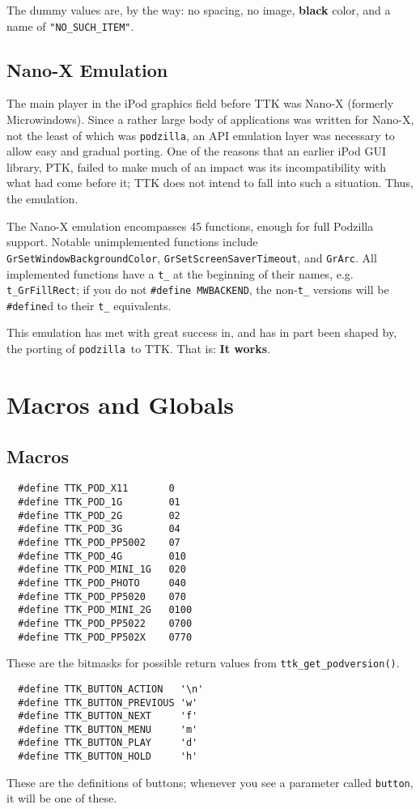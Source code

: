 \documentclass[12pt,letterpaper]{report}
\def\pz{\texttt{podzilla}}
\let\ttt\tt
\def\tt{\def\_{{\ttt\char`\_}}\ttt}
\def\texttt#1{{\tt #1}}
\begin{document}
The dummy values are, by the way: no spacing, no image, {\bf black} color, and a name of
\verb|"NO_SUCH_ITEM"|.

\section{Nano-X Emulation}
The main player in the iPod graphics field before TTK was Nano-X (formerly Microwindows).
Since a rather large body of applications was written for Nano-X, not the least of which was \pz,
an API emulation layer was necessary to allow easy and gradual porting. One of the reasons
that an earlier iPod GUI library, PTK, failed to make much of an impact was its incompatibility
with what had come before it; TTK does not intend to fall into such a situation. Thus, the emulation.

The Nano-X emulation encompasses 45 functions, enough for full Podzilla support. Notable
unimplemented functions include \verb|GrSetWindowBackground|\-\verb|Color|, \verb|GrSetScreenSaverTimeout|,
and \verb|GrArc|. All implemented functions have a \verb|t_| at the beginning of their names, e.g.
\verb|t_GrFillRect|; if you do not \verb|#define MWBACKEND|, the non-\verb|t_| versions will be
\verb|#define|d to their \verb|t_| equivalents.

This emulation has met with great success in, and has in part been shaped by, the porting of \pz\ to TTK.
That is: {\bf It works}.

\chapter{Macros and Globals}
\section{Macros}
\begin{verbatim}
  #define TTK_POD_X11       0
  #define TTK_POD_1G        01
  #define TTK_POD_2G        02
  #define TTK_POD_3G        04
  #define TTK_POD_PP5002    07
  #define TTK_POD_4G        010
  #define TTK_POD_MINI_1G   020
  #define TTK_POD_PHOTO     040
  #define TTK_POD_PP5020    070
  #define TTK_POD_MINI_2G   0100
  #define TTK_POD_PP5022    0700
  #define TTK_POD_PP502X    0770
\end{verbatim}
These are the bitmasks for possible return values from \verb|ttk_get_podversion()|.

\begin{verbatim}
  #define TTK_BUTTON_ACTION   '\n'
  #define TTK_BUTTON_PREVIOUS 'w'
  #define TTK_BUTTON_NEXT     'f'
  #define TTK_BUTTON_MENU     'm'
  #define TTK_BUTTON_PLAY     'd'
  #define TTK_BUTTON_HOLD     'h'
\end{verbatim}
These are the definitions of buttons; whenever you see a parameter called {\tt button}, it will
be one of these.
\end{document}
